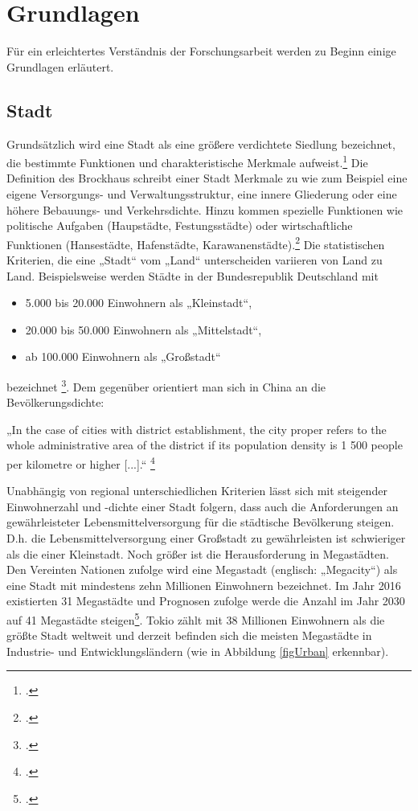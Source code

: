 \documentclass{scrartcl}
\begin{document}
\section{Grundlagen}

Für ein erleichtertes Verständnis der Forschungsarbeit werden zu Beginn einige Grundlagen erläutert.

\subsection{Stadt}

Grundsätzlich wird eine Stadt als eine größere verdichtete Siedlung bezeichnet, die bestimmte Funktionen und charakteristische Merkmale aufweist.\footcite{HaasDefinitionWirtschaftslexikon} Die Definition des Brockhaus schreibt einer Stadt Merkmale zu wie zum Beispiel eine eigene Versorgungs- und Verwaltungsstruktur, eine innere Gliederung oder eine höhere Bebauungs- und Verkehrsdichte. Hinzu kommen spezielle Funktionen wie politische Aufgaben (Haupstädte, Festungsstädte) oder wirtschaftliche Funktionen (Hansestädte, Hafenstädte, Karawanenstädte).\footcite{BrockhausStadt} Die statistischen Kriterien, die eine „Stadt“ vom „Land“ unterscheiden variieren von Land zu Land. Beispielsweise werden Städte in der Bundesrepublik Deutschland mit 
\begin{itemize}
\item 5.000 bis 20.000 Einwohnern als „Kleinstadt“,
\item 20.000 bis 50.000 Einwohnern als „Mittelstadt“,
\item ab 100.000 Einwohnern als „Großstadt“ 
\end{itemize}
bezeichnet \footcite{Bssr}. Dem gegenüber orientiert man sich in China an die Bevölkerungsdichte: 

\begin{displayquote}
„In the case of cities with district establishment, the city proper refers to the whole administrative area of the district if its population density is 1 500 people per kilometre or higher [...].“ \footcite[S.~2]{UnitedNations2005Table2005} 
\end{displayquote}

Unabhängig von regional unterschiedlichen Kriterien lässt sich mit steigender Einwohnerzahl und -dichte einer Stadt folgern, dass auch die Anforderungen an gewährleisteter Lebensmittelversorgung für die städtische Bevölkerung steigen. D.h. die Lebensmittelversorgung einer Großstadt zu gewährleisten ist schwieriger als die einer Kleinstadt. Noch größer ist die Herausforderung in Megastädten. Den Vereinten Nationen zufolge wird eine Megastadt (englisch: „Megacity“) als eine Stadt mit mindestens zehn Millionen Einwohnern bezeichnet. Im Jahr 2016 existierten 31 Megastädte und Prognosen zufolge werde die Anzahl im Jahr 2030 auf 41 Megastädte steigen\footcite{UnitedNations2016The2016}. Tokio zählt mit 38 Millionen Einwohnern als die größte Stadt weltweit und derzeit befinden sich die meisten Megastädte in Industrie- und Entwicklungsländern (wie in Abbildung \ref{figUrban} erkennbar). 
\end{document}
